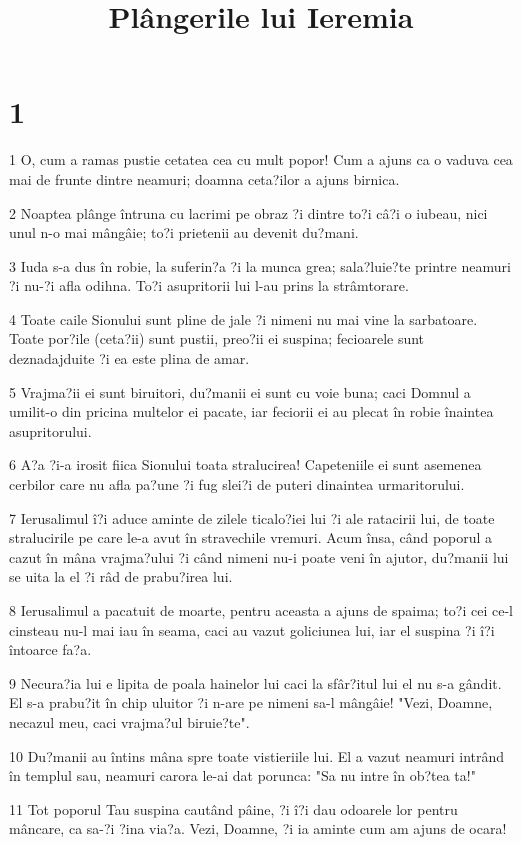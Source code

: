 

\title{Plângerile lui Ieremia}


\chapter{1}

\par 1 O, cum a ramas pustie cetatea cea cu mult popor! Cum a ajuns ca o vaduva cea mai de frunte dintre neamuri; doamna ceta?ilor a ajuns birnica.
\par 2 Noaptea plânge întruna cu lacrimi pe obraz ?i dintre to?i câ?i o iubeau, nici unul n-o mai mângâie; to?i prietenii au devenit du?mani.
\par 3 Iuda s-a dus în robie, la suferin?a ?i la munca grea; sala?luie?te printre neamuri ?i nu-?i afla odihna. To?i asupritorii lui l-au prins la strâmtorare.
\par 4 Toate caile Sionului sunt pline de jale ?i nimeni nu mai vine la sarbatoare. Toate por?ile (ceta?ii) sunt pustii, preo?ii ei suspina; fecioarele sunt deznadajduite ?i ea este plina de amar.
\par 5 Vrajma?ii ei sunt biruitori, du?manii ei sunt cu voie buna; caci Domnul a umilit-o din pricina multelor ei pacate, iar feciorii ei au plecat în robie înaintea asupritorului.
\par 6 A?a ?i-a irosit fiica Sionului toata stralucirea! Capeteniile ei sunt asemenea cerbilor care nu afla pa?une ?i fug slei?i de puteri dinaintea urmaritorului.
\par 7 Ierusalimul î?i aduce aminte de zilele ticalo?iei lui ?i ale ratacirii lui, de toate stralucirile pe care le-a avut în stravechile vremuri. Acum însa, când poporul a cazut în mâna vrajma?ului ?i când nimeni nu-i poate veni în ajutor, du?manii lui se uita la el ?i râd de prabu?irea lui.
\par 8 Ierusalimul a pacatuit de moarte, pentru aceasta a ajuns de spaima; to?i cei ce-l cinsteau nu-l mai iau în seama, caci au vazut goliciunea lui, iar el suspina ?i î?i întoarce fa?a.
\par 9 Necura?ia lui e lipita de poala hainelor lui caci la sfâr?itul lui el nu s-a gândit. El s-a prabu?it în chip uluitor ?i n-are pe nimeni sa-l mângâie! "Vezi, Doamne, necazul meu, caci vrajma?ul biruie?te".
\par 10 Du?manii au întins mâna spre toate vistieriile lui. El a vazut neamuri intrând în templul sau, neamuri carora le-ai dat porunca: "Sa nu intre în ob?tea ta!"
\par 11 Tot poporul Tau suspina cautând pâine, ?i î?i dau odoarele lor pentru mâncare, ca sa-?i ?ina via?a. Vezi, Doamne, ?i ia aminte cum am ajuns de ocara!
